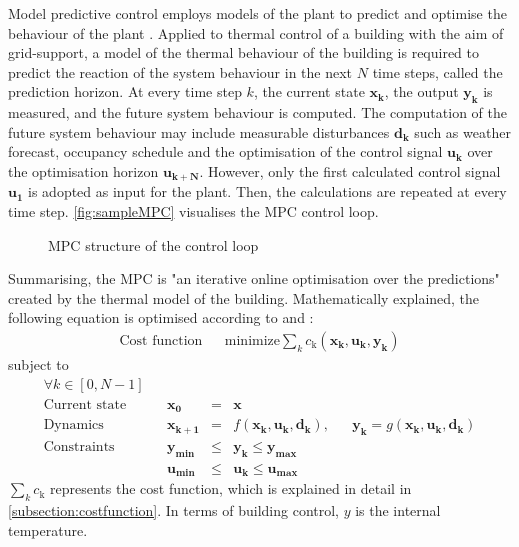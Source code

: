 Model predictive control employs models of the plant to predict and optimise the behaviour of the plant \cite{Grune.2017}.
Applied to thermal control of a building with the aim of grid-support, a model of the thermal behaviour of the building is required to predict the reaction of the system behaviour in the next $N$ time steps, called the prediction horizon. At every time step $k$, the current state $\mathbf{x_k}$, the output $\mathbf{y_k}$ is measured, and the future system behaviour is computed. The computation of the future system behaviour may include measurable disturbances $\mathbf{d_k}$  such as weather forecast, occupancy schedule and the optimisation of the control signal $\mathbf{u_k}$ over the optimisation horizon $\mathbf{u_{k+N}}$. However, only the first calculated control signal $\mathbf{u_1}$ is adopted as input for the plant.
Then, the calculations are repeated at every time step. \autoref{fig:sampleMPC} visualises the MPC control loop.
 \begin{figure}[H]
    \centering
   \def\svgwidth{320pt}
    
    \caption{MPC structure of the control loop}
    \label{fig:sampleMPC}
    \end{figure}
\newpage
Summarising, the MPC is "an iterative online optimisation over the predictions"
\cite{Grune.2017} 
created by the thermal model of the building. Mathematically explained, the following equation is optimised according to
\cite{Kouvaritakis.2018}
and
\cite{Oldewurtel.2012}:
\begin{align}
\label{eq:costfunc}
\textrm{Cost function} && \text{minimize} \sum_{k} c_\text{k}(\mathbf{x_k,u_k,y_k})
\end{align}
subject to 
\begin{align*}
\forall k \in [0,N-1]\\
\textrm{Current state} && \mathbf{x_0} &=& \mathbf{x} \\	
\textrm{Dynamics} && \mathbf{x_{k+1}}&=& f(\mathbf{x_k,u_k,d_k}),		&&	\mathbf{y_k} = g(\mathbf{x_k,u_k,d_k})\\				
\textrm{Constraints} && \mathbf{y_{min}}&\leq& \mathbf{y_k} \leq \mathbf{y_{max}}\\		
\textrm{} && \mathbf{u_{min}}&\leq& \mathbf{u_k} \leq \mathbf{u_{max}}	
\end{align*}
$\sum_{k} c_\text{k}$ represents the cost function, which is explained in detail in \autoref{subsection:costfunction}. In terms of building control, $y$ is the internal temperature.

